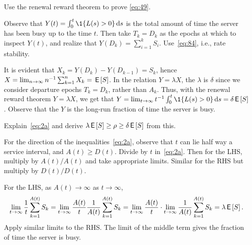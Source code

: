 \begin{exercise}\label{ex:l-162}
Use the renewal reward theorem to prove \cref{eq:49}.
\begin{hint}
  Observe that $Y(t) = \int_0^t \1{\L(s)>0} \d s$ is the total amount of time the server has been busy up to the time $t$.
  Then take $T_k = D_k$ as the epochs at which to inspect $Y(t)$, and realize that $Y(D_{k}) = \sum_{i=1}^{k} S_{i}$.
  Use~\cref{eq:84}, i.e., rate stability.
\end{hint}
\begin{solution}
 It is evident that $X_k = Y(D_k)-Y(D_{k-1})=S_k$, hence $X = \lim_{n\to\infty} n^{-1}\sum_{k=1}^n X_k = \,\mathsf{E}\left[S\right]$.
 In the relation $Y = \lambda X$, the $\lambda$ is $\delta$ since we consider departure epochs $T_k = D_k$, rather than $A_k$.
 Thus, with the renewal reward theorem $Y=\lambda X$, we get that $Y = \lim_{t\to\infty} t^{-1} \int_0^t \1{\L(s)>0} \d s = \delta \E S$.
Observe that the $Y$ is the long-run fraction of time the server is busy.
\end{solution}
\end{exercise}


\begin{exercise}\label{ex:70}
Explain~\cref{eq:2a} and derive $\lambda \,\mathsf{E}\left[S\right] \geq \rho \geq \delta \,\mathsf{E}\left[S\right]$ from this.
\begin{hint}
For the direction of the inequalities~\cref{eq:2a}, observe that $t$ can lie half way a service interval, and $A(t) \geq D(t)$.
Divide by $t$ in~\cref{eq:2a}. Then for the LHS, multiply by $A(t)/A(t)$ and take appropriate limits. Similar for the RHS but multiply by $D(t)/D(t)$.
\end{hint}
\begin{solution}

  For the LHS, as $A(t)\to \infty$ as $t\to\infty$,
\begin{equation*}
 \lim_{t\to\infty} \frac 1 t\sum_{k=1}^{A(t)} S_k =
 \lim_{t\to\infty} \frac{A(t)}t \frac{1}{A(t)} \sum_{k=1}^{A(t)} S_k =
 \lim_{t\to\infty} \frac{A(t)}t \cdot \lim_{t\to\infty}\frac{1}{A(t)} \sum_{k=1}^{A(t)} S_k = \lambda \,\mathsf{E}\left[S\right].
\end{equation*}
Apply similar limits to the RHS.
The limit of the middle term gives the fraction of time the server is busy.
\end{solution}
\end{exercise}





